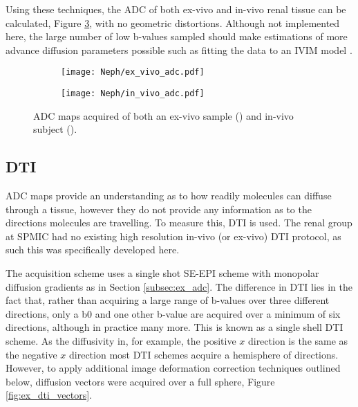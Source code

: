 Using these techniques, the \ac{ADC} of both ex-vivo and in-vivo renal tissue can be calculated, Figure \ref{fig:ex_adc_maps}, with no geometric distortions. Although not implemented here, the large number of low b-values sampled should make estimations of more advance diffusion parameters possible such as fitting the data to an \ac{IVIM} model \cite{le_bihan_separation_1988}.

\begin{figure}[H]
	\centering
	\begin{subfigure}[c]{0.47\textwidth}
		\centering
		\texttt{[image: Neph/ex\_vivo\_adc.pdf]}%
		\caption{}
		\label{fig:ex_adc_maps_ex_vivo}
	\end{subfigure}
	\hfill
	\begin{subfigure}[c]{0.47\textwidth}
		\centering
		\texttt{[image: Neph/in\_vivo\_adc.pdf]}%
		\caption{}
		\label{fig:ex_adc_maps_in_vivo}
	\end{subfigure}
	\caption{\ac{ADC} maps acquired of both an ex-vivo sample () and in-vivo subject ().}
	\label{fig:ex_adc_maps}
\end{figure}

\subsection{\acl*{DTI}}

\ac{ADC} maps provide an understanding as to how readily molecules can diffuse through a tissue, however they do not provide any information as to the directions molecules are travelling. To measure this, \ac{DTI} is used. The renal group at \ac{SPMIC} had no existing high resolution in-vivo (or ex-vivo) \ac{DTI} protocol, as such this was specifically developed here.

The acquisition scheme uses a single shot \ac{SE}-\ac{EPI} scheme with monopolar diffusion gradients as in Section \ref{subsec:ex_adc}. The difference in \ac{DTI} lies in the fact that, rather than acquiring a large range of b-values over three different directions, only a b0 and one other b-value are acquired over a minimum of six directions, although in practice many more. This is known as a single shell \ac{DTI} scheme. As the diffusivity in, for example, the positive $x$ direction is the same as the negative $x$ direction most \ac{DTI} schemes acquire a hemisphere of directions. However, to apply additional image deformation correction techniques outlined below, diffusion vectors were acquired over a full sphere, Figure \ref{fig:ex_dti_vectors}.

